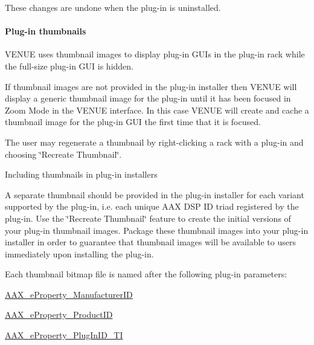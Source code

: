  These changes are undone when the plug-\/in is uninstalled.

\hypertarget{a00849_subsubsection__aax_venue_guide__installer__optional_files__thumbnails}{}\paragraph{Plug-\/in thumbnails}\label{a00849_subsubsection__aax_venue_guide__installer__optional_files__thumbnails}
 V\+E\+N\+UE uses thumbnail images to display plug-\/in G\+U\+Is in the plug-\/in rack while the full-\/size plug-\/in G\+UI is hidden.

 If thumbnail images are not provided in the plug-\/in installer then V\+E\+N\+UE will display a generic thumbnail image for the plug-\/in until it has been focused in Zoom Mode in the V\+E\+N\+UE interface. In this case V\+E\+N\+UE will create and cache a thumbnail image for the plug-\/in G\+UI the first time that it is focused.

 The user may regenerate a thumbnail by right-\/clicking a rack with a plug-\/in and choosing \char`\"{}\+Recreate Thumbnail\char`\"{}.

 Including thumbnails in plug-\/in installers

 A separate thumbnail should be provided in the plug-\/in installer for each variant supported by the plug-\/in, i.\+e. each unique A\+AX D\+SP ID triad registered by the plug-\/in. Use the \char`\"{}\+Recreate Thumbnail\char`\"{} feature to create the initial versions of your plug-\/in thumbnail images. Package these thumbnail images into your plug-\/in installer in order to guarantee that thumbnail images will be available to users immediately upon installing the plug-\/in.

 Each thumbnail bitmap file is named after the following plug-\/in parameters\+: 
\begin{DoxyEnumerate}
\item \mbox{\hyperlink{a00662_a13e384f22825afd3db6d68395b79ce0da996465cca29a2a15291d1c788ac5728c}{A\+A\+X\+\_\+e\+Property\+\_\+\+Manufacturer\+ID}} 
\item \mbox{\hyperlink{a00662_a13e384f22825afd3db6d68395b79ce0da3a41fcdff5af1a4fd19dcbca7b1ba6f3}{A\+A\+X\+\_\+e\+Property\+\_\+\+Product\+ID}} 
\item \mbox{\hyperlink{a00662_a13e384f22825afd3db6d68395b79ce0da75f174df4efbeca86eaada126c1d9214}{A\+A\+X\+\_\+e\+Property\+\_\+\+Plug\+In\+I\+D\+\_\+\+TI}} 
\end{DoxyEnumerate}

